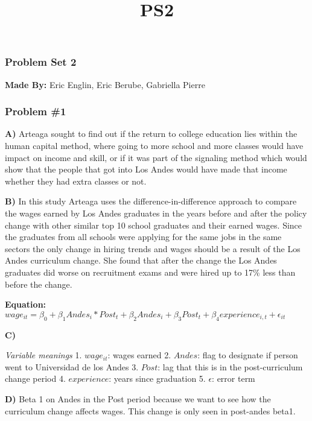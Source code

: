 \documentclass[11pt]{article}
\title{PS2}
\begin{document}
    
    
    \maketitle
    
    

    
    \hypertarget{problem-set-2}{%
\subsubsection{Problem Set 2}\label{problem-set-2}}

\textbf{Made By:} Eric Englin, Eric Berube, Gabriella Pierre

    \hypertarget{problem-1}{%
\subsubsection{Problem \#1}\label{problem-1}}

    \textbf{A)} Arteaga sought to find out if the return to college
education lies within the human capital method, where going to more
school and more classes would have impact on income and skill, or if it
was part of the signaling method which would show that the people that
got into Los Andes would have made that income whether they had extra
classes or not.

    \textbf{B)} In this study Arteaga uses the difference-in-difference
approach to compare the wages earned by Los Andes graduates in the years
before and after the policy change with other similar top 10 school
graduates and their earned wages. Since the graduates from all schools
were applying for the same jobs in the same sectors the only change in
hiring trends and wages should be a result of the Los Andes curriculum
change. She found that after the change the Los Andes graduates did
worse on recruitment exams and were hired up to 17\% less than before
the change.

\textbf{Equation:}
\(wage_{it} = \beta_0 + \beta_1 Andes_i*Post_t + \beta_2 Andes_i + \beta_3 Post_t + \beta_4 experience_{i,t} + \epsilon_{it}\)

    \textbf{C)}

\emph{Variable meanings} 1. \(wage_{it}\): wages earned 2. \(Andes\):
flag to designate if person went to Universidad de los Andes 3.
\(Post\): lag that this is in the post-curriculum change period 4.
\(experience\): years since graduation 5. \(\epsilon\): error term

    \textbf{D)} Beta 1 on Andes in the Post period because we want to see
how the curriculum change affects wages. This change is only seen in
post-andes beta1.
\end{document}
